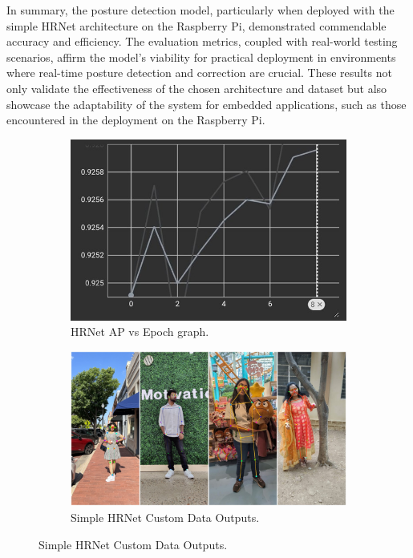 \documentclass{article}
\begin{document}
In summary, the posture detection model, particularly when deployed with the simple HRNet architecture on the Raspberry Pi, demonstrated commendable accuracy and efficiency. The evaluation metrics, coupled with real-world testing scenarios, affirm the model's viability for practical deployment in environments where real-time posture detection and correction are crucial. These results not only validate the effectiveness of the chosen architecture and dataset but also showcase the adaptability of the system for embedded applications, such as those encountered in the deployment on the Raspberry Pi.

\begin{figure}
  \centering
  \begin{subfigure}[b]{0.4\textwidth}
    \includegraphics[width=\textwidth]{Picture1.jpg}
    \caption{HRNet AP vs Epoch graph.}
    \label{fig:sub1}
  \end{subfigure}
  \begin{subfigure}[b]{0.55\textwidth}
    \includegraphics[width=\textwidth]{Image.jpg}
    \caption{Simple HRNet Custom Data Outputs.}
    \label{fig:sub2}
  \end{subfigure}
  \label{fig:group}
\end{figure}
\end{document}
